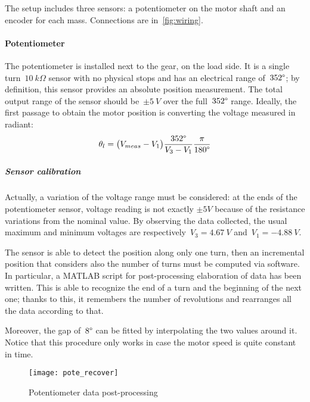 The setup includes three sensors: a potentiometer on the motor shaft and an encoder for each mass. Connections are in~\cref{fig:wiring}.

\paragraph{Potentiometer}
The potentiometer is installed next to the gear, on the load side. It is a single turn~$10 \ k\Omega$ sensor with no physical stops and has an electrical range of~$352\degree$; by definition, this sensor provides an absolute position measurement.
The total output range of the sensor should be~$\pm 5\ V$ over the full~$352\degree$ range.
Ideally, the first passage to obtain the motor position is converting the voltage measured in radiant:
\[
	\theta_l = \bigl{(} V_{meas} - V_1 \bigr{)} \frac{352 \degree }{V_3 - V_1} \frac{\pi}{180 \degree }
\]

\subparagraph{Sensor calibration}
Actually, a variation of the voltage range must be considered: at the ends of the potentiometer sensor, voltage reading is not exactly $\pm 5V$ because of the resistance variations from the nominal value. By observing the data collected, the usual maximum and minimum voltages are respectively~$V_3=4.67 \ V$ and~$V_1=-4.88 \ V$.

The sensor is able to detect the position along only one turn, then an incremental position that considers also the number of turns must be computed via software.
In particular, a MATLAB script for post-processing elaboration of data has been written. This is able to recognize the end of a turn and the beginning of the next one; thanks to this, it remembers the number of revolutions and rearranges all the data according to that.

Moreover, the gap of~$8 \degree$ can be fitted by interpolating the two values around it. Notice that this procedure only works in case the motor speed is quite constant in time.
\begin{figure*}[h]
	\centering
	\texttt{[image: pote\_recover]}
	\caption{Potentiometer data post-processing}
\end{figure*}

